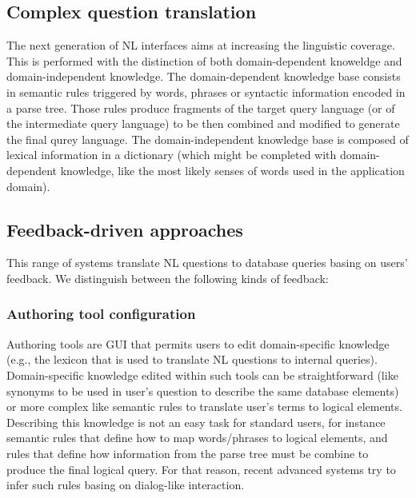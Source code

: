 \documentclass[10pt,journal,letterpaper,compsoc]{IEEEtran}
\begin{document}
 







\subsection{Complex question translation}
The next generation of NL interfaces aims at increasing the linguistic coverage.
This is performed with the distinction of both domain-dependent knoweldge and
domain-independent knowledge.
The domain-dependent knowledge base consists in semantic rules triggered by
words, phrases or syntactic information encoded in a parse tree. Those rules
produce fragments of the target query language (or of the intermediate query
language) to be then combined and modified to generate the final qurey language.
The domain-independent knowledge base is composed of lexical information in a
dictionary (which might be completed with domain-dependent knowledge, like the
most likely senses of words used in the application domain).







\subsection{Feedback-driven approaches}
This range of systems translate NL questions to database queries basing on
users' feedback. 
We distinguish between the following kinds of feedback:


\subsubsection{Authoring tool configuration}
Authoring tools are GUI that permits users to edit domain-specific knowledge
(e.g., the lexicon that is used to translate NL questions to internal queries). 
Domain-specific knowledge edited within such tools can be straightforward (like
synonyms to be used in user's question to describe the same database elements)
or more complex like semantic rules to translate user's terms to logical
elements.
Describing this knowledge is not an easy task for standard users, for instance
semantic rules that define how to map words/phrases to logical elements, and
rules that define how information from the parse tree must be combine to
produce the final logical query.
For that reason, recent advanced systems try to infer such rules basing on
dialog-like interaction. 
\end{document}
